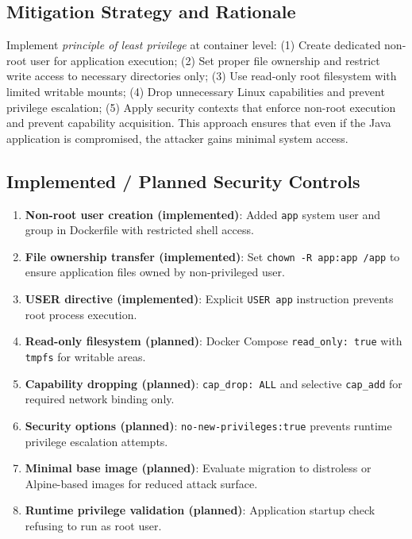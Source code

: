 \documentclass[]{UCD_CS_FYP_Report}
\begin{document}
\subsection*{Mitigation Strategy and Rationale}
Implement \textit{principle of least privilege} at container level: (1) Create dedicated non-root user for application execution; (2) Set proper file ownership and restrict write access to necessary directories only; (3) Use read-only root filesystem with limited writable mounts; (4) Drop unnecessary Linux capabilities and prevent privilege escalation; (5) Apply security contexts that enforce non-root execution and prevent capability acquisition. This approach ensures that even if the Java application is compromised, the attacker gains minimal system access.

\subsection*{Implemented / Planned Security Controls}
\begin{enumerate}
  \item \textbf{Non-root user creation (implemented)}: Added \texttt{app} system user and group in Dockerfile with restricted shell access.
  \item \textbf{File ownership transfer (implemented)}: Set \texttt{chown -R app:app /app} to ensure application files owned by non-privileged user.
  \item \textbf{USER directive (implemented)}: Explicit \texttt{USER app} instruction prevents root process execution.
  \item \textbf{Read-only filesystem (planned)}: Docker Compose \texttt{read\_only: true} with \texttt{tmpfs} for writable areas.
  \item \textbf{Capability dropping (planned)}: \texttt{cap\_drop: ALL} and selective \texttt{cap\_add} for required network binding only.
  \item \textbf{Security options (planned)}: \texttt{no-new-privileges:true} prevents runtime privilege escalation attempts.
  \item \textbf{Minimal base image (planned)}: Evaluate migration to distroless or Alpine-based images for reduced attack surface.
  \item \textbf{Runtime privilege validation (planned)}: Application startup check refusing to run as root user.
\end{enumerate}
\end{document}
